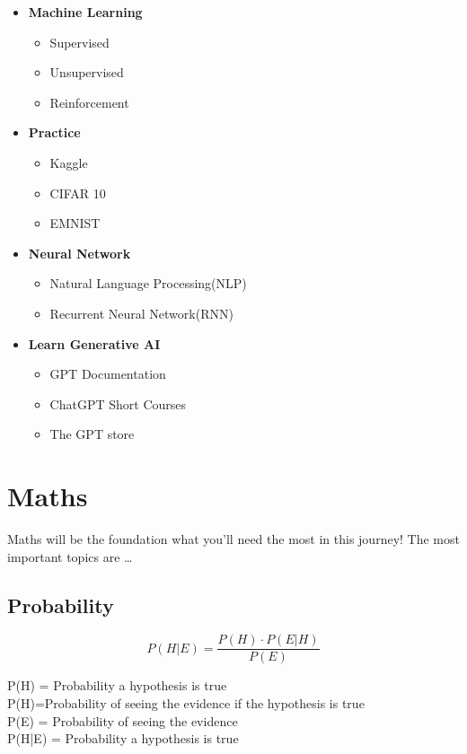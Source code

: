 \documentclass{book}
\begin{document}
\begin{itemize}
	\item \textbf{Machine Learning}
	      \begin{itemize}
		      \item Supervised
		      \item Unsupervised
		      \item Reinforcement
	      \end{itemize}
	\item \textbf{Practice}
	      \begin{itemize}
		      \item Kaggle
		      \item CIFAR 10
		      \item EMNIST
	      \end{itemize}
	\item \textbf{Neural Network}
	      \begin{itemize}
		      \item Natural Language Processing(NLP)
		      \item Recurrent Neural Network(RNN)
	      \end{itemize}
	\item \textbf{Learn Generative AI}
	      \begin{itemize}
		      \item GPT Documentation
		      \item ChatGPT Short Courses
		      \item The GPT store
	      \end{itemize}
\end{itemize}


\chapter{Maths}

Maths will be the foundation what you'll need the most in this journey!
The most important topics are \dots

\section{Probability}

\begin{equation}
	P(H|E) = \frac{P(H) \cdot P(E|H)}{P(E)}
\end{equation}

P(H) = Probability  a  hypothesis  is  true\\
P(H)=Probability  of   seeing  the  evidence  if   the  hypothesis  is  true\\
P(E) = Probability   of   seeing   the   evidence\\
P(H|E) = Probability   a  hypothesis   is   true \\
\end{document}
